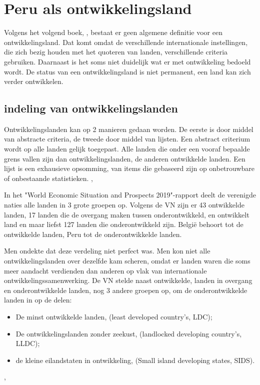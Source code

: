 \section{Peru als ontwikkelingsland}
Volgens het volgend boek, \autocite{MarcJ.Bossuyt2005}, bestaat er geen algemene definitie voor een ontwikkelingsland. Dat komt omdat de verschillende internationale instellingen, die zich bezig houden met het quoteren van landen, verschillende criteria gebruiken. Daarnaast is het soms niet duidelijk wat er met ontwikkeling bedoeld wordt.
De status van een ontwikkelingsland is niet permanent, een land kan zich verder ontwikkelen.

\subsection{indeling van ontwikkelingslanden}
Ontwikkelingslanden kan op 2 manieren gedaan worden. De eerste is door middel van abstracte criteria, de tweede door middel van lijsten. Een abstract criterium wordt op alle landen gelijk toegepast. Alle landen die onder een vooraf bepaalde grens vallen zijn dan ontwikkelingslanden, de anderen ontwikkelde landen. Een lijst is een exhausieve opsomming, van items die gebaseerd zijn op onbetrouwbare of onbestaande statistieken. \autocite{MarcJ.Bossuyt2005},

In het "World Economic Situation and Prospects 2019"-rapport deelt de verenigde naties alle landen in 3 grote groepen op. Volgens de VN zijn er 43 ontwikkelde landen, 17 landen die de overgang maken tussen onderontwikkeld, en ontwikkelt land en maar liefst 127 landen die onderontwikkeld zijn. België behoort tot de ontwikkelde landen, Peru tot de onderontwikkelde landen. \autocite{unitednations2019}

Men ondekte dat deze verdeling niet perfect was. Men kon niet alle ontwikkelingslanden over dezelfde kam scheren, omdat er landen waren die soms meer aandacht verdienden dan anderen op vlak van internationale ontwikkelingssamenwerking. De VN stelde naast ontwikkelde, landen in overgang en onderontwikkelde landen, nog 3 andere groepen op, om de onderontwikkelde landen in op de delen: 
\begin{itemize}
\item De minst ontwikkelde landen, (least developed country's, LDC);
\item De ontwikkelingslanden zonder zeekust, (landlocked developing country's, LLDC);
\item de kleine eilandstaten in ontwikkeling, (Small island developing states, SIDS).
\end{itemize}
\autocite{MarcJ.Bossuyt2005},

